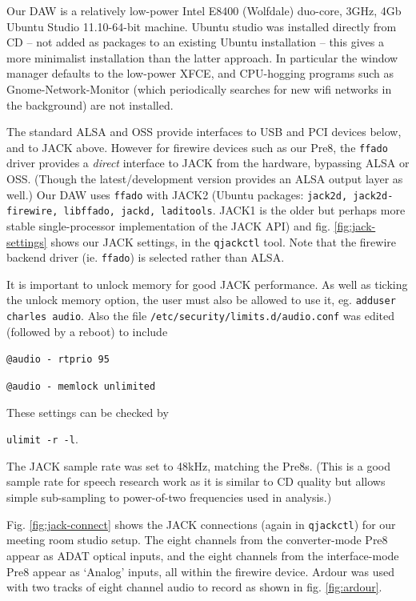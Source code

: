 \documentclass[oneside,english]{scrbook}
\begin{document}
Our DAW is a relatively low-power Intel E8400 (Wolfdale) duo-core, 3GHz, 4Gb Ubuntu Studio 11.10-64-bit machine.   Ubuntu studio was installed directly from CD -- not added as packages to an existing Ubuntu installation -- this gives a more minimalist installation than the latter approach.  In particular the window manager defaults to the low-power XFCE, and CPU-hogging programs such as Gnome-Network-Monitor (which periodically searches for new wifi networks in the background) are not installed.

The standard ALSA and OSS provide interfaces to USB and PCI devices below, and to JACK above.  However for firewire devices such as our Pre8, the {\tt ffado} driver  provides a {\em direct} interface to JACK from the hardware, bypassing ALSA or OSS.  (Though the latest/development version provides an ALSA output layer as well.)   Our DAW uses {\tt ffado} with JACK2 (Ubuntu packages: {\tt jack2d, jack2d-firewire, libffado, jackd, laditools}.  JACK1 is the older but perhaps more stable single-processor implementation of the JACK API) and fig. \ref{fig:jack-settings} shows our JACK settings, in the {\tt qjackctl} tool.  Note that the firewire backend driver (ie. {\tt ffado}) is selected rather than ALSA.

It is important to unlock memory for good JACK performance.  As well as ticking the unlock memory option, the user must also be allowed to use it, eg. {\tt adduser charles audio}.  Also the file {\tt /etc/security/limits.d/audio.conf} was edited (followed by a reboot) to include

{\tt @audio - rtprio 95 }

{\tt @audio - memlock unlimited }

These settings can be checked by

{\tt ulimit -r -l}.

The JACK sample rate was set to 48kHz, matching the Pre8s.  (This is a good sample rate for speech research work as it is similar to CD quality but allows simple sub-sampling to power-of-two frequencies used in analysis.)

Fig. \ref{fig:jack-connect} shows the JACK connections (again in {\tt qjackctl}) for our meeting room studio setup.  The eight channels from the converter-mode Pre8 appear as ADAT optical inputs, and the eight channels from the interface-mode Pre8 appear as `Analog' inputs, all within the firewire device.  Ardour was used with two tracks of eight channel audio to record as shown in fig. \ref{fig:ardour}.
\end{document}
